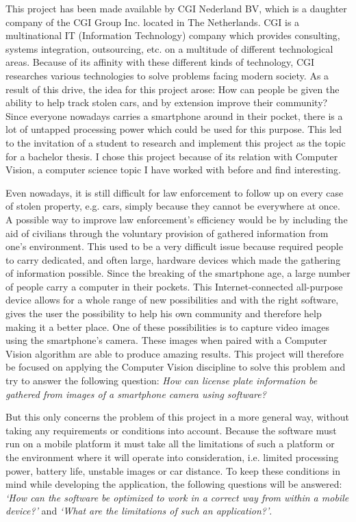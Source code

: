 
This project has been made available by CGI Nederland BV, which is a daughter company of the CGI Group Inc. located in The Netherlands. CGI is a multinational IT (Information Technology) company which provides consulting, systems integration, outsourcing, etc. on a multitude of different technological areas. Because of its affinity with these different kinds of technology, CGI researches various technologies to solve problems facing modern society. As a result of this drive, the idea for this project arose: How can people be given the ability to help track stolen cars, and by extension improve their community? Since everyone nowadays carries a smartphone around in their pocket, there is a lot of untapped processing power which could be used for this purpose. This led to the invitation of a student to research and implement this project as the topic for a bachelor thesis. I chose this project because of its relation with Computer Vision, a computer science topic I have worked with before and find interesting.


Even nowadays, it is still difficult for law enforcement to follow up on every case of stolen property, e.g. cars, simply because they cannot be everywhere at once. A possible way to improve law enforcement's efficiency would be by including the aid of civilians through the voluntary provision of gathered information from one's environment. This used to be a very difficult issue because required people to carry dedicated, and often large, hardware devices which made the gathering of information possible. Since the breaking of the smartphone age, a large number of people carry a computer in their pockets. This Internet-connected all-purpose device allows for a whole range of new possibilities and with the right software, gives the user the possibility to help his own community and therefore help making it a better place. One of these possibilities is to capture video images using the smartphone's camera. These images when paired with a Computer Vision algorithm are able to produce amazing results. This project will therefore be focused on applying the Computer Vision discipline to solve this problem and try to answer the following question: \textit{How can license plate information be gathered from images of a smartphone camera using software?}

But this only concerns the problem of this project in a more general way, without taking any requirements or conditions into account. Because the software must run on a mobile platform it must take all the limitations of such a platform or the environment where it will operate into consideration, i.e. limited processing power, battery life, unstable images or car distance. To keep these conditions in mind while developing the application, the following questions will be answered: \textit{`How can the software be optimized to work in a correct way from within a mobile device?'} and \textit{`What are the limitations of such an application?'}.

